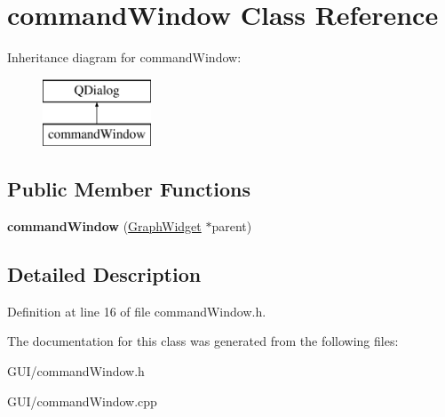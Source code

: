 \hypertarget{classcommand_window}{}\section{command\+Window Class Reference}
\label{classcommand_window}
Inheritance diagram for command\+Window\+:\begin{figure}[H]
\begin{center}
\leavevmode
\includegraphics[height=2.000000cm]{classcommand_window}
\end{center}
\end{figure}
\subsection*{Public Member Functions}
\begin{DoxyCompactItemize}
\item 
\mbox{\label{classcommand_window_aa5e5461d5ce4a59400bf9aba9117af84}} 
{\bfseries command\+Window} (\hyperlink{class_graph_widget}{Graph\+Widget} $\ast$parent)
\end{DoxyCompactItemize}


\subsection{Detailed Description}


Definition at line 16 of file command\+Window.\+h.



The documentation for this class was generated from the following files\+:\begin{DoxyCompactItemize}
\item 
G\+U\+I/command\+Window.\+h\item 
G\+U\+I/command\+Window.\+cpp\end{DoxyCompactItemize}
